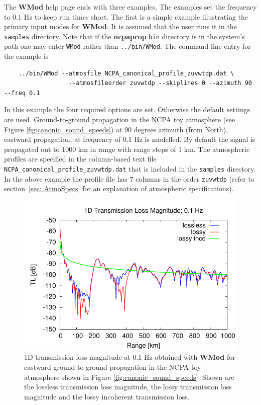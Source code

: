 The \textbf{WMod} help page ends with three examples. The examples set the frequency to 0.1 Hz to keep run times short. The first is a simple example illustrating the primary input modes for \textbf{WMod}. It is assumed that the user runs it in the \verb+samples+ directory. Note that if the \textbf{ncpaprop} \verb+bin+ directory is in the system's path one may enter \verb+WMod+ rather than \verb+../bin/WMod+. The command line entry for the example is 
\begin{verbatim} 
    ../bin/WMod --atmosfile NCPA_canonical_profile_zuvwtdp.dat \ 
                  --atmosfileorder zuvwtdp --skiplines 0 --azimuth 90 --freq 0.1
\end{verbatim}
In this example the four required options are set. Otherwise the default settings are used. Ground-to-ground propagation in the NCPA toy atmosphere (see Figure \ref{fig:canonic_sound_speeds}) at 90 degrees azimuth (from North), eastward propagation, at frequency of 0.1 Hz is modelled. By default the signal is propagated out to 1000 km in range with range steps of 1 km. The atmospheric profiles are specified in the column-based text file \verb"NCPA_canonical_profile_zuvwtdp.dat" that is included in the \verb+samples+ directory. In the above example the profile file has 7 columns in the order \verb"zuvwtdp" (refer to section~\ref{sec: AtmoSpecs}  for an explanation of atmospheric specifications).

\begin{figure}
\begin{center}
\includegraphics[scale=0.60]{figs/modess_ex1}
\end{center}
\caption{1D transmission loss magnitude at 0.1 Hz obtained with \textbf{WMod} for eastward ground-to-ground propagation in the NCPA toy atmosphere shown in Figure \ref{fig:canonic_sound_speeds}. Shown are the lossless transmission loss magnitude, the lossy transmission loss magnitude and the lossy incoherent transmission loss.}
\label{fig: wmod 1D tl}
\end{figure}

